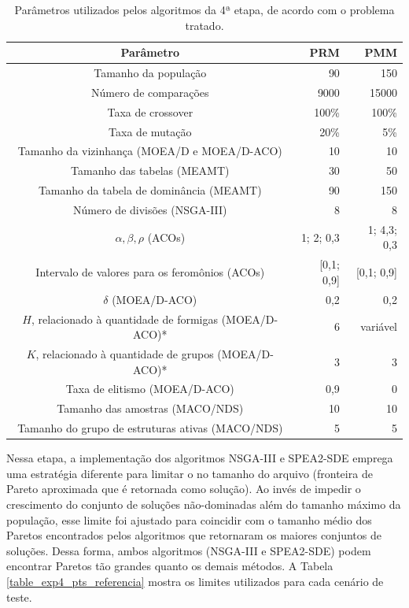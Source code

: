 \begin{table}[!htbp]
	\caption{Parâmetros utilizados pelos algoritmos da 4ª etapa, de acordo com o problema tratado.}
	\label{table_exp4_params}
	\begin{center}
		\begin{tabular}{c|r|r}
			\textbf{Parâmetro} & \textbf{PRM} &  \textbf{PMM} \\ %
			\hline
			Tamanho da população               &    90 &      150 \\ %
			Número de comparações        &   9000 &      15000 \\ %
			Taxa de crossover                & 100\% &    100\% \\ %
			Taxa de mutação                 &  20\% &      5\% \\ %
			Tamanho da vizinhança (MOEA/D e MOEA/D-ACO)    &    10 &       10 \\ %
			Tamanho das tabelas (MEAMT)   &    30 &       50 \\ %
			Tamanho da tabela de dominância (MEAMT) &    90 &      150 \\ %
			Número de divisões (NSGA-III)&     8 &        8 \\ %
			$\alpha, \beta, \rho$ (ACOs)& 1; 2; 0,3 & 1; 4,3; 0,3 \\ %
			Intervalo de valores para os feromônios (ACOs)& [0,1; 0,9] & [0,1; 0,9] \\ %
			$\delta$ (MOEA/D-ACO)& 0,2 & 0,2 \\ %
			$H$, relacionado à quantidade de formigas (MOEA/D-ACO)*& 6 & variável \\ %
			$K$, relacionado à quantidade de grupos (MOEA/D-ACO)*& 3 & 3 \\ %
			Taxa de elitismo (MOEA/D-ACO)& 0,9 & 0 \\ %
			Tamanho das amostras (MACO/NDS)& 10 & 10 \\  %
			Tamanho do grupo de estruturas ativas (MACO/NDS)& 5 & 5 \\
			\hline
		\end{tabular}
	\end{center}
\end{table}

Nessa etapa, a implementação dos algoritmos NSGA-III e SPEA2-SDE emprega uma estratégia diferente para limitar o no tamanho do arquivo (fronteira de Pareto aproximada que é retornada como solução). Ao invés de impedir o crescimento do conjunto de soluções não-dominadas além do tamanho máximo da população, esse limite foi ajustado para coincidir com o tamanho médio dos Paretos encontrados pelos algoritmos que retornaram os maiores conjuntos de soluções. Dessa forma, ambos algoritmos (NSGA-III e SPEA2-SDE) podem encontrar Paretos tão grandes quanto os demais métodos. A Tabela \ref{table_exp4_pts_referencia} mostra os limites utilizados para cada cenário de teste.

